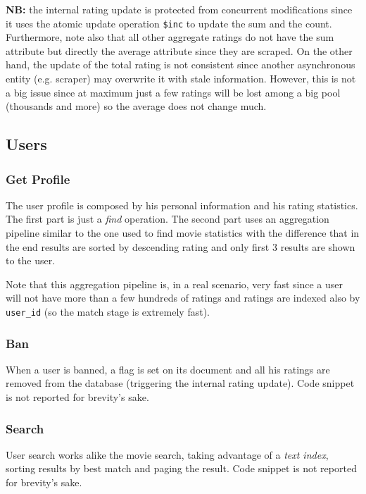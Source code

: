 \documentclass[11pt]{article}
\begin{document}
\textbf{NB: } the internal rating update is protected from concurrent modifications since it uses the atomic update operation \texttt{\$inc} to update the sum and the count. Furthermore, note also that all other aggregate ratings do not have the sum attribute but directly the average attribute since they are scraped. On the other hand, the update of the total rating is not consistent since another asynchronous entity (e.g. scraper) may overwrite it with stale information. However, this is not a big issue since at maximum just a few ratings will be lost among a big pool (thousands and more) so the average does not change much.



\subsection{Users}
\subsubsection{Get Profile}
The user profile is composed by his personal information and his rating
statistics. The first part is just a \emph{find} operation. The second part uses an aggregation pipeline similar to the one used to find movie statistics with the difference that in the end results are sorted by descending rating and only first 3 results are shown to the user.

Note that this aggregation pipeline is, in a real scenario, very fast since a user will not have more than a few hundreds of ratings and ratings are indexed also by \texttt{user\_id} (so the match stage is extremely fast).



\subsubsection{Ban}
When a user is banned, a flag is set on its document and all his ratings are removed from the database (triggering the internal rating update). Code snippet is not reported for brevity's sake.

\subsubsection{Search}
User search works alike the movie search, taking advantage of a \emph{text index}, sorting results by best match and paging the result. Code snippet is not reported for brevity's sake.
\end{document}
